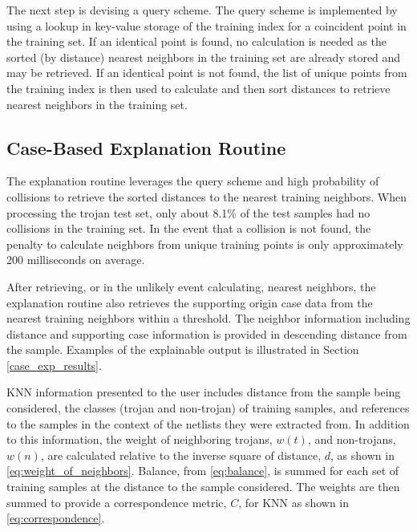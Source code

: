 The next step is devising a query scheme.  The query scheme is implemented by
using a lookup in key-value storage of the training index for a coincident point
in the training set.  If an identical point is found, no calculation is needed
as the sorted (by distance) nearest neighbors in the training set are already
stored and may be retrieved. If an identical point is not found, the list of
unique points from the training index is then used to calculate and then sort
distances to retrieve nearest neighbors in the training set.

\subsection{Case-Based Explanation Routine}

The explanation routine leverages the query scheme and high probability of
collisions to retrieve the sorted distances to the nearest training neighbors.
When processing the trojan test set, only about 8.1\% of the test samples had no
collisions in the training set.  In the event that a collision is not found, the
penalty to calculate neighbors from unique training points is only approximately
200 milliseconds on average.

After retrieving, or in the unlikely event calculating, nearest neighbors, the
explanation routine also retrieves the supporting origin case data from the nearest
training neighbors within a threshold.  The neighbor information including distance
and supporting case information is provided in descending distance from the sample.
Examples of the explainable output is illustrated in Section \ref{case_exp_results}. 


KNN information presented to the user includes distance from the sample being
considered, the classes (trojan and non-trojan) of training samples, and
references to the samples in the context of the netlists they were extracted
from.  In addition to this information, the weight of neighboring trojans,
$w(t)$, and non-trojans, $w(n)$, are calculated relative to the inverse square
of distance, $d$, as shown in \ref{eq:weight_of_neighbors}.  Balance, from
\ref{eq:balance}, is summed for each set of training samples at the distance to
the sample considered.  The weights are then summed to provide a correspondence
metric, $C$, for KNN as shown in \ref{eq:correspondence}.
